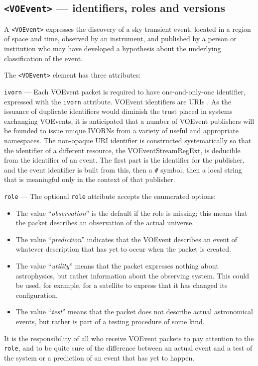 \documentclass[11pt,a4paper]{ivoa}
\begin{document}
\subsection{{\tt <VOEvent>} --- identifiers, roles and versions}
\label{sec:3.1}
A {\tt <VOEvent>} expresses the discovery of a sky transient event, located in a region of space and time, observed by an instrument, and published by a person or institution who may have developed a hypothesis about the underlying classification of the event. 

The {\tt <VOEvent>} element has three attributes:  

 {\tt ivorn} \label{sec:3.1.1} ---
Each VOEvent packet is required to have one-and-only-one identifier, expressed with the {\tt ivorn} attribute. VOEvent identifiers are URIs 
\citep{2016ivoa.spec.0523D}. As the issuance of duplicate identifiers would diminish the trust placed in systems exchanging VOEvents, it is anticipated that a number of VOEvent publishers will be founded to issue unique IVORNs from a variety of useful and appropriate namespaces. The non-opaque URI identifier is constructed systematically so that the identifier of a different resource, the VOEventStreamRegExt, is deducible from the identifier of an event. The first part is the identifier for the publisher, and the event identifier is built from this, then a {\tt\#} symbol, then a local string that is meaningful only in the context of that publisher.

 {\tt role} \label{sec:3.1.2} ---
The optional {\tt role} attribute accepts the enumerated options:
\begin{itemize}
\item The value ``\emph{observation}'' is the default if the role is missing; this means that the packet describes an observation of the actual universe. 
\item The value ``\emph{prediction}'' indicates that the VOEvent describes an event of whatever description that has yet to occur when the packet is created. 
\item The value ``\emph{utility}'' means that the packet expresses nothing about astrophysics, but rather information about the observing system. This could be used, for example, for a satellite to express that it has changed its configuration. 
\item The value ``\emph{test}'' means that the packet does not describe actual astronomical events, but rather is part of a testing procedure of some kind.
\end{itemize}
It is the responsibility of all who receive VOEvent packets to pay attention to the {\tt role}, and to be quite sure of the difference between an actual event and a test of the system or a prediction of an event that has yet to happen. 
\end{document}
